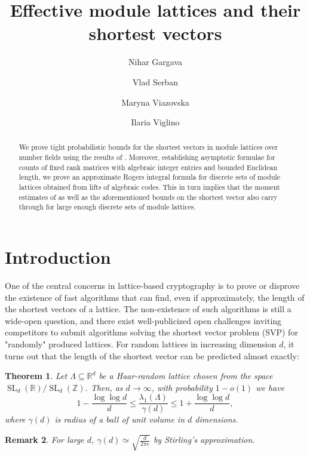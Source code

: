 \documentclass{amsart}
\newtheorem{theorem}{Theorem}
\newtheorem{remark}[theorem]{Remark}
\DeclareMathOperator{\SL}{SL}
\begin{document}
\title{Effective module lattices and their shortest vectors}
\author[N. Gargava]{Nihar Gargava}
\author[V. Serban]{Vlad Serban}
\author[M. Viazovska]{Maryna Viazovska}
\author[I. Viglino]{Ilaria Viglino}

\address{N. Gargava, Section of Mathematics, EPFL, Switzerland}
\address{V. Serban, Department of Mathematics, New College of Florida, U.S.A.}
\address{M. Viazovska, Section of Mathematics, EPFL, Switzerland}
\address{I. Viglino, Section of Mathematics, EPFL, Switzerland}

\maketitle

\begin{abstract}
We prove tight probabilistic bounds for the shortest vectors in module lattices over number fields using the results of \cite{GSV23}. Moreover, establishing asymptotic formulae for counts of fixed rank matrices with algebraic integer entries and bounded Euclidean length, we prove an approximate Rogers integral formula for discrete sets of module lattices obtained from lifts of algebraic codes. This in turn implies that the moment estimates of \cite{GSV23} as well as the aforementioned bounds on the shortest vector also carry through for large enough discrete sets of module lattices. 
\end{abstract}

\section{Introduction}
  \label{se:intro}

One of the central concerns in lattice-based cryptography is to prove or disprove the existence
of fast algorithms that can find, even if approximately, the length of the shortest vectors of a lattice.
The non-existence of such algorithms is still a wide-open question, and there exist well-publicized open challenges \cite{BLR08}
inviting competitors to submit algorithms solving the shortest vector problem (SVP) for "randomly" produced lattices. For random lattices in increasing dimension $d$, it turns out that the length of the shortest vector can be predicted almost exactly:
\begin{theorem}
\cite[Theorem 5]{LN20}
\label{th:phong}
Let $\Lambda\subseteq \mathbb{R}^{d}$ be a Haar-random lattice chosen from the space $\SL_{d}(\mathbb{R})/\SL_{d}(\mathbb{Z})$. Then, as $d \rightarrow \infty$, with probability $1- o(1)$ we have 
\begin{equation}
  1-\frac{\log \log d}{d} \leq \frac{\lambda_1(\Lambda)}{\gamma(d)} \leq 1 + \frac{\log\log d}{d},
\end{equation}
where $\gamma(d)$ is radius of a ball of unit volume in $d$ dimensions. 
\end{theorem}
\begin{remark}
\label{re:gamma}
For large $d$, $\gamma(d) \simeq \sqrt{\tfrac{d}{2 \pi e}}$ by Stirling's approximation.
\end{remark}
\end{document}
